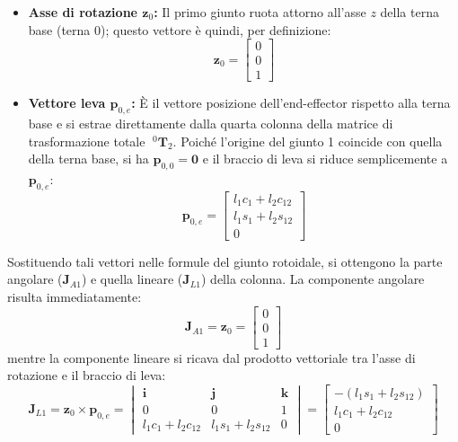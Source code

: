 \documentclass[11pt, a4paper]{report}
\begin{document}
\begin{itemize}
    \item \textbf{Asse di rotazione \(\bm{z}_0\):} Il primo giunto ruota attorno all'asse \(z\) della terna base (terna 0); questo vettore è quindi, per definizione:
    \[ \bm{z}_0 = \begin{bmatrix} 0 \\ 0 \\ 1 \end{bmatrix} \]
    \item \textbf{Vettore leva \(\bm{p}_{0,e}\):} È il vettore posizione dell'end-effector rispetto alla terna base e si estrae direttamente dalla quarta colonna della matrice di trasformazione totale \(\;^{0}{\bm{T}}_2\). Poiché l'origine del giunto 1 coincide con quella della terna base, si ha \(\bm{p}_{0,0} = \bm{0}\) e il braccio di leva si riduce semplicemente a \(\bm{p}_{0,e}\):
    \[ \bm{p}_{0,e} = \begin{bmatrix} l_1 c_1 + l_2 c_{12} \\ l_1 s_1 + l_2 s_{12} \\ 0 \end{bmatrix} \]
\end{itemize}
Sostituendo tali vettori nelle formule del giunto rotoidale, si ottengono la parte angolare (\(\bm{J}_{A1}\)) e quella lineare (\(\bm{J}_{L1}\)) della colonna. La componente angolare risulta immediatamente:
\[
    \bm{J}_{A1} = \bm{z}_0 = \begin{bmatrix} 0 \\ 0 \\ 1 \end{bmatrix}
\]
mentre la componente lineare si ricava dal prodotto vettoriale tra l'asse di rotazione e il braccio di leva:
\[
    \bm{J}_{L1} = \bm{z}_0 \times \bm{p}_{0,e} =
    \begin{vmatrix}
        \bm{i} & \bm{j} & \bm{k} \\
        0 & 0 & 1 \\
        l_1 c_1 + l_2 c_{12} & l_1 s_1 + l_2 s_{12} & 0
    \end{vmatrix}
    = \begin{bmatrix} -(l_1 s_1 + l_2 s_{12}) \\ l_1 c_1 + l_2 c_{12} \\ 0 \end{bmatrix}
\]
\end{document}
